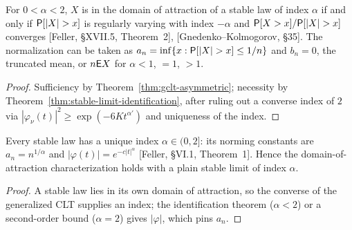 \begin{theorem}
  \label{thm:doa-stable-iff}
  \leanok
  For $0 < \alpha < 2$, $X$ is in the domain of attraction of a stable law of index $\alpha$ if and only if $\mathsf{P}[|X| > x]$ is
  regularly varying with index $-\alpha$ and $\mathsf{P}[X > x]/\mathsf{P}[|X| > x]$ converges [Feller, \S XVII.5, Theorem~2],
  [Gnedenko--Kolmogorov, \S35]. The normalization can be taken as $a_n = \inf\{x : \mathsf{P}[|X| > x] \le 1/n\}$ and
  $b_n = 0$, the truncated mean, or $n\mathsf{E} X$ for $\alpha < 1$, $= 1$, $> 1$.
\end{theorem}
\begin{proof}
  \leanok
  Sufficiency by Theorem~\ref{thm:gclt-asymmetric}; necessity by Theorem~\ref{thm:stable-limit-identification}, after
  ruling out a converse index of $2$ via $|\varphi_\nu(t)|^2 \ge \exp(-6 K t^{\alpha'})$ and uniqueness of the index.
\end{proof}

\begin{theorem}
  \label{thm:stable-index}
  \leanok
  Every stable law has a unique index $\alpha \in (0, 2]$: its norming constants are $a_n = n^{1/\alpha}$ and
  $|\varphi(t)| = e^{-c|t|^\alpha}$ [Feller, \S VI.1, Theorem~1]. Hence the domain-of-attraction characterization holds with
  a plain stable limit of index $\alpha$.
\end{theorem}
\begin{proof}
  \leanok
  A stable law lies in its own domain of attraction, so the converse of the generalized CLT supplies an index; the
  identification theorem ($\alpha < 2$) or a second-order bound ($\alpha = 2$) gives $|\varphi|$, which pins $a_n$.
\end{proof}

